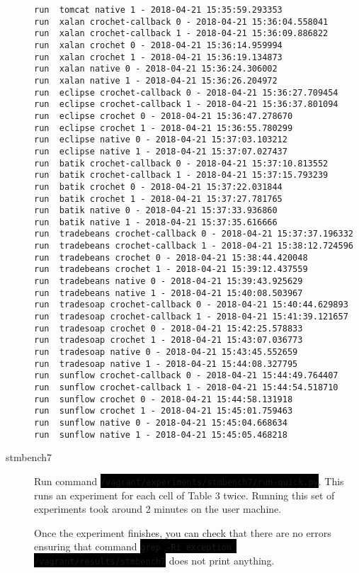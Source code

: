 \documentclass[12pt]{article}
\newcommand{\command}[1]{\colorbox{black}{\texttt{\color{white}#1}}}
\begin{document}
\begin{description}
\begin{verbatim}
run  tomcat native 1 - 2018-04-21 15:35:59.293353
run  xalan crochet-callback 0 - 2018-04-21 15:36:04.558041
run  xalan crochet-callback 1 - 2018-04-21 15:36:09.886822
run  xalan crochet 0 - 2018-04-21 15:36:14.959994
run  xalan crochet 1 - 2018-04-21 15:36:19.134873
run  xalan native 0 - 2018-04-21 15:36:24.306002
run  xalan native 1 - 2018-04-21 15:36:26.204972
run  eclipse crochet-callback 0 - 2018-04-21 15:36:27.709454
run  eclipse crochet-callback 1 - 2018-04-21 15:36:37.801094
run  eclipse crochet 0 - 2018-04-21 15:36:47.278670
run  eclipse crochet 1 - 2018-04-21 15:36:55.780299
run  eclipse native 0 - 2018-04-21 15:37:03.103212
run  eclipse native 1 - 2018-04-21 15:37:07.027437
run  batik crochet-callback 0 - 2018-04-21 15:37:10.813552
run  batik crochet-callback 1 - 2018-04-21 15:37:15.793239
run  batik crochet 0 - 2018-04-21 15:37:22.031844
run  batik crochet 1 - 2018-04-21 15:37:27.781765
run  batik native 0 - 2018-04-21 15:37:33.936860
run  batik native 1 - 2018-04-21 15:37:35.616666
run  tradebeans crochet-callback 0 - 2018-04-21 15:37:37.196332
run  tradebeans crochet-callback 1 - 2018-04-21 15:38:12.724596
run  tradebeans crochet 0 - 2018-04-21 15:38:44.420048
run  tradebeans crochet 1 - 2018-04-21 15:39:12.437559
run  tradebeans native 0 - 2018-04-21 15:39:43.925629
run  tradebeans native 1 - 2018-04-21 15:40:08.503967
run  tradesoap crochet-callback 0 - 2018-04-21 15:40:44.629893
run  tradesoap crochet-callback 1 - 2018-04-21 15:41:39.121657
run  tradesoap crochet 0 - 2018-04-21 15:42:25.578833
run  tradesoap crochet 1 - 2018-04-21 15:43:07.036773
run  tradesoap native 0 - 2018-04-21 15:43:45.552659
run  tradesoap native 1 - 2018-04-21 15:44:08.327795
run  sunflow crochet-callback 0 - 2018-04-21 15:44:49.764407
run  sunflow crochet-callback 1 - 2018-04-21 15:44:54.518710
run  sunflow crochet 0 - 2018-04-21 15:44:58.131918
run  sunflow crochet 1 - 2018-04-21 15:45:01.759463
run  sunflow native 0 - 2018-04-21 15:45:04.668634
run  sunflow native 1 - 2018-04-21 15:45:05.468218
\end{verbatim}

    \item[stmbench7] Run command
        \command{/vagrant/experiments/stmbench7/run-quick.py}.  This runs an
        experiment for each cell of Table 3 twice.  Running this set of
        experiments took around 2 minutes on the user machine.

        Once the experiment finishes, you can check that there are no errors
        ensuring that command \command{grep -Ri exception /vagrant/results/stmbench7}
        does not print anything.


\end{description}
\end{document}
